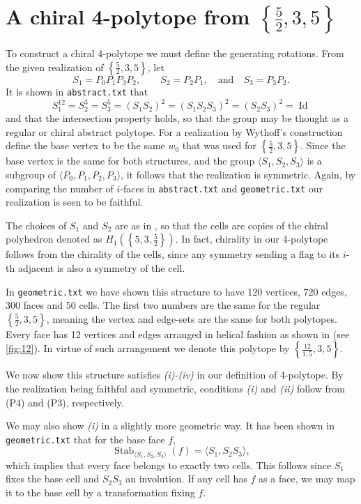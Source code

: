 \documentclass{article}
\theoremstyle{definition}
\DeclareMathOperator{\Id}{Id}
\DeclareMathOperator{\Stab}{Stab}
\begin{document}
	\section{A chiral 4-polytope from $\left\{\frac{5}{2},3,5\right\}$}
	To construct a chiral 4-polytope we must define the generating rotations. From the given realization of $\left\{\frac{5}{2},3,5\right\}$, let
		\[S_1=P_0P_1P_3P_2,\qquad S_2=P_2P_1,\quad\text{and}\quad S_3=P_3P_2.\]
	It is shown in \texttt{abstract.txt} that
		\[S_1^{12}=S_2^3=S_3^5=(S_1S_2)^2=(S_1S_2S_3)^2=(S_2S_3)^2=\Id\]
	and that the intersection property holds, so that the group may be thought as a regular or chiral abstract polytope. For a realization by Wythoff's construction define the base vertex to be the same $w_0$ that was used for $\left\{\frac{5}{2},3,5\right\}$. Since the base vertex is the same for both structures, and the group $\langle S_1,S_2,S_3\rangle$ is a subgroup of $\langle P_0,P_1,P_2,P_3\rangle$, it follows that the realization is symmetric. Again, by comparing the number of $i$-faces in \texttt{abstract.txt} and \texttt{geometric.txt} our realization is seen to be faithful.
	
	The choices of $S_1$ and $S_2$ are as in  \cite{petcox}, so that the cells are copies of the chiral polyhedron denoted as $H_1(\left\{5,3,\frac{5}{2}\right\})$. In fact, chirality in our 4-polytope follows from the chirality of the cells, since any symmetry sending a flag to its $i$-th adjacent is also a symmetry of the cell.
	
	In \texttt{geometric.txt} we have shown this structure to have 120 vertices, 720 edges, 300 faces and 50 cells. The first two numbers are the same for the regular $\left\{\frac{5}{2},3,5\right\}$, meaning the vertex and edge-sets are the same for both polytopes. Every face has 12 vertices and edges arranged in helical fashion as shown in \cite{petcox} (see \cref{fig:12}). In virtue of such arrangement we denote this polytope by $\left\{\frac{12}{1,5},3,5\right\}$.
	
	
	We now show this structure satisfies \textit{(i)-(iv)} in our definition of 4-polytope. By the realization being faithful and symmetric, conditions \textit{(i)} and \textit{(ii)} follow from (P4) and (P3), respectively.
	
	We may also show \textit{(i)} in a slightly more geometric way. It has been shown in  \texttt{geometric.txt} that for the base face $f$,
	\begin{equation*}\label{ec:stab-face}
		\Stab_{\langle S_1,S_2,S_3\rangle}(f)=\langle S_1,S_2S_3\rangle,
	\end{equation*}
	which implies that every face belongs to exactly two cells. This follows since $S_1$ fixes the base cell and $S_2S_3$ an involution. If any cell has $f$ as a face, we may map it to the base cell by a transformation fixing $f$.
	
\end{document}

